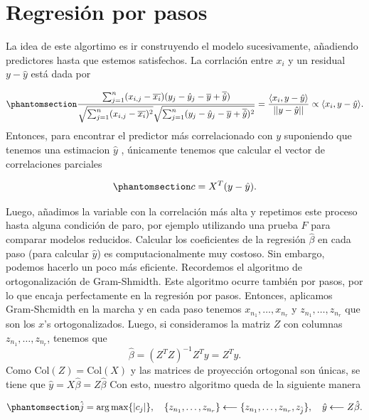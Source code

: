 \documentclass[
  letterpaper,
  DIV=11,
  numbers=noendperiod]{scrreprt}
\theoremstyle{plain}
\theoremstyle{definition}
\theoremstyle{remark}
\begin{document}
\section{Regresión por pasos}\label{regresiuxf3n-por-pasos}

La idea de este algortimo es ir construyendo el modelo sucesivamente,
añadiendo predictores hasta que estemos satisfechos. La corrlación entre
\(x_i\) y un residual \(y-\hat y\) está dada por

\begin{equation}\phantomsection\label{eq-corr}{
\frac{\sum_{j=1}^n (x_{i,j}-\overline{x_i})(y_j-\hat y_j-\overline y+\overline{\hat y}  )}{\sqrt{\sum_{j=1}^n(x_{i,j}-\overline{x_i})^2}\sqrt{\sum_{j=1}^n(y_j-\hat y_j-\overline{y}+\overline{\hat y})^2}}=\frac{\langle x_i,y -\hat y\rangle}{||y-\hat y||}\propto \langle x_i,y-\hat y\rangle.
}\end{equation} Entonces, para encontrar el predictor más correlacionado
con \(y\) suponiendo que tenemos una estimacion \(\hat y\) , únicamente
tenemos que calcular el vector de correlaciones parciales

\begin{equation}\phantomsection\label{eq-corrpa}{
c=X^T(y-\hat y).
}\end{equation}

Luego, añadimos la variable con la correlación más alta y repetimos este
proceso hasta alguna condición de paro, por ejemplo utilizando una
prueba \(F\) para comparar modelos reducidos. Calcular los coeficientes
de la regresión \(\hat\beta\) en cada paso (para calcular \(\hat y\)) es
computacionalmente muy costoso. Sin embargo, podemos hacerlo un poco más
eficiente. Recordemos el algoritmo de ortogonalización de Gram-Shmidth.
Este algoritmo ocurre también por pasos, por lo que encaja perfectamente
en la regresión por pasos. Entonces, aplicamos Gram-Shcmidth en la
marcha y en cada paso tenemos \(x_{n_1},\dots, x_{n_r}\) y
\(z_{n_1},\dots, z_{n_r}\) que son los \(x\)'s ortogonalizados. Luego,
si consideramos la matriz \(Z\) con columnas \(z_{n_1},\dots, z_{n_r}\),
tenemos que \[
\hat\beta = (Z^TZ)^{-1}Z^Ty=Z^Ty.
\] Como \(\text{Col}(Z)=\text{Col}(X)\) y las matrices de proyección
ortogonal son únicas, se tiene que \(\hat y=X\hat\beta=Z\hat\beta\) Con
esto, nuestro algoritmo queda de la siguiente manera

\begin{equation}\phantomsection\label{eq-step}{
\hat j =\arg\max \{|c_j|\},\quad \{z_{n_1},\dots,z_{n_r}\}\longleftarrow \{z_{n_1},\dots,z_{n_r}, z_{\hat j}\},\quad \hat y \longleftarrow Z\hat \beta.
}\end{equation}
\end{document}

